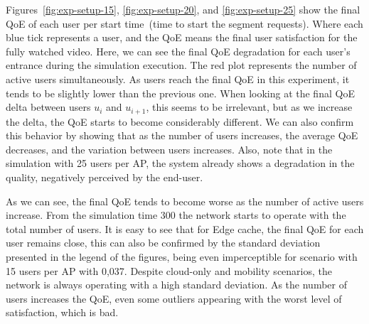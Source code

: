 Figures~\ref{fig:exp-setup-15}, \ref{fig:exp-setup-20}, and \ref{fig:exp-setup-25} show the final QoE of each user per start time~(time to start the segment requests). 
Where each blue tick represents a user, and
the QoE means the final user satisfaction for the fully watched video.
Here, we can see the final QoE degradation for each user's entrance during the simulation execution.
The red plot represents the number of active users simultaneously.  
As users reach the final QoE in this experiment, it tends to be slightly lower than the previous one. When looking at the final QoE delta between users $u_{i}$ and $u_{i + 1}$, this seems to be irrelevant, but as we increase the delta, the QoE starts to become considerably different. We can also confirm this behavior by showing that as the number of users increases, the average QoE decreases, and the variation between users increases. Also, note that in the simulation with 25 users per AP, the system already shows a degradation in the quality, negatively perceived by the end-user.

As we can see, the final QoE tends to become worse as the number of active users increase. From the simulation time 300 the network starts to operate with the total number of users. It is easy to see that for Edge cache, the final QoE for each user remains close, this can also be confirmed by the standard deviation presented in the legend of the figures, being even imperceptible for scenario with 15 users per AP with 0,037.
Despite cloud-only and mobility scenarios, the network is always operating with a high standard deviation. As the number of users increases the QoE, even some outliers appearing with the worst level of satisfaction, which is bad.




